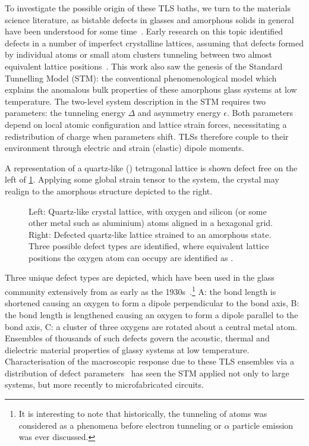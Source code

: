 To investigate the possible origin of these TLS baths, we turn to the materials science literature, as bistable defects in glasses and amorphous solids in general have been understood for some time~\cite{Zachariasen1932,Anderson1972}.
Early research on this topic identified defects in a number of imperfect crystalline lattices, assuming that defects formed by individual atoms or small atom clusters tunneling between two almost equivalent lattice positions~\cite{Anderson1972,Phillips1972}.
This work also saw the genesis of the Standard Tunnelling Model (STM): the conventional phenomenological  model which explains the anomalous bulk properties of these amorphous glass systems at low temperature.
The two-level system description in the STM requires two parameters: the tunneling energy $\Delta$ and asymmetry energy $\epsilon$.
Both parameters depend on local atomic configuration and lattice strain forces, necessitating a redistribution of charge when parameters shift.
TLSs therefore couple to their environment through electric and strain (elastic) dipole moments.

A representation of a quartz-like () tetragonal lattice is shown defect free on the left of \cref{fig:sio2}.
Applying some global strain tensor to the system, the crystal may realign to the amorphous structure depicted to the right.
\begin{figure}[htp]
\widefiguremargins
\begin{adjustwidth}{\leftwidth}{\rightwidth}
\resizebox{\widefigure}{!}{}
\caption[Quartz-like Crystal Lattice, Pure and Defected]{\label{fig:sio2}Left: Quartz-like crystal lattice, with oxygen \resizebox{!}{0.6em}{} and silicon (or some other metal such as aluminium) \resizebox{!}{0.6em}{} atoms aligned in a hexagonal grid. Right: Defected quartz-like lattice strained to an amorphous state. Three possible defect types are identified, where equivalent lattice positions the oxygen atom can occupy are identified as \resizebox{!}{0.6em}{}.}
\end{adjustwidth}
\end{figure}

Three unique defect types are depicted, which have been used in the glass community extensively from as early as the 1930s~\cite{Zachariasen1932}.\footnote{It is interesting to note that historically, the tunneling of atoms was considered as a phenomena before electron tunneling or $\alpha$ particle emission was ever discussed.}
A: the bond length is shortened causing an oxygen to form a dipole perpendicular to the bond axis, B: the bond length is lengthened causing an oxygen to form a dipole parallel to the bond axis, C: a cluster of three oxygens are rotated about a central metal atom.
Ensembles of thousands of such defects govern the acoustic, thermal and dielectric material properties of glassy systems at low temperature.
Characterisation of the macroscopic response due to these TLS ensembles via a distribution of defect parameters~\cite{Enss2005} has seen the STM applied not only to large systems, but more recently to microfabricated circuits.

